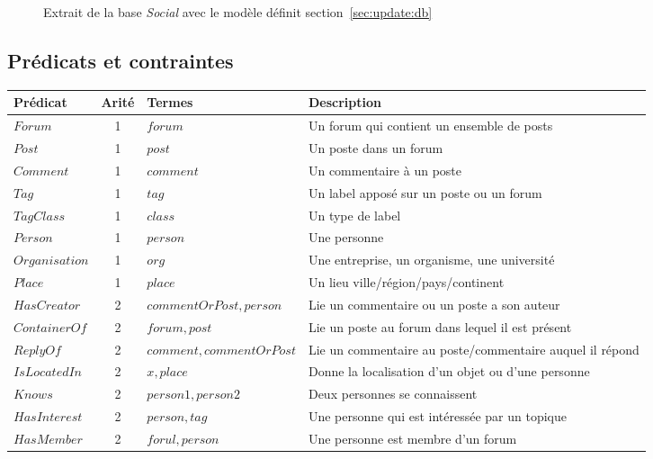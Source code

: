 \begin{figure}[H]
    \caption{Extrait de la base \textit{Social} avec le modèle définit section~\ref{sec:update:db}}
\end{figure}

\subsection{Prédicats et contraintes}

\begin{table}[H]
    \centering
    \begin{adjustbox}{max width=\linewidth}
        \begin{tabular}{l|c|l|l}
            Prédicat & Arité & Termes & Description \\
            \hline
            \hline
            $Forum$ & 1 & $forum$ & Un forum qui contient un ensemble de posts \\
            $Post$ & 1 & $post$ & Un poste dans un forum \\
            $Comment$ & 1 & $comment$ & Un commentaire à un poste \\
            $Tag$ & 1 & $tag$ & Un label apposé sur un poste ou un forum \\
            $TagClass$ & 1 & $class$ & Un type de label \\
            $Person$ & 1 & $person$ & Une personne \\
            $Organisation$ & 1 & $org$ & Une entreprise, un organisme, une université \\
            $Place$ & 1 & $place$ & Un lieu ville/région/pays/continent \\
            $HasCreator$ & 2 & $commentOrPost, person$ & Lie un commentaire ou un poste a son auteur \\
            $ContainerOf$ & 2 & $forum, post$ & Lie un poste au forum dans lequel il est présent \\
            $ReplyOf$ & 2 & $comment, commentOrPost$ & Lie un commentaire au poste/commentaire auquel il répond \\
            $IsLocatedIn$ & 2 & $x, place$ & Donne la localisation d'un objet ou d'une personne \\
            $Knows$ & 2 & $person1, person2$ & Deux personnes se connaissent \\
            $HasInterest$ & 2 & $person, tag$ & Une personne qui est intéressée par un topique \\
            $HasMember$ & 2 & $forul, person$ & Une personne est membre d'un forum \\

\end{tabular}
\end{adjustbox}
\end{table}
